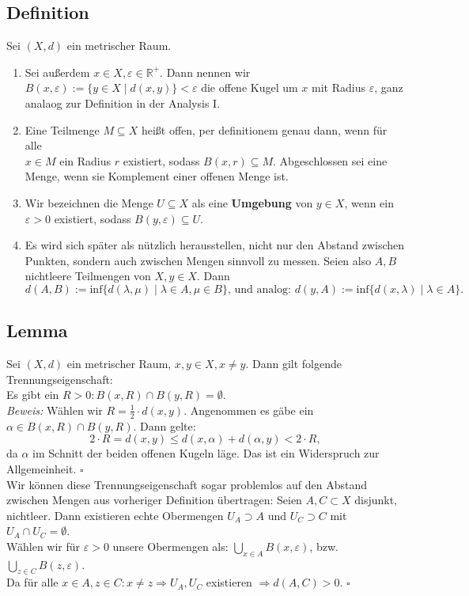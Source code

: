 \documentclass[11pt,leqno]{article}
\begin{document}
\subsection{Definition}
Sei $(X,d)$ ein metrischer Raum.
\begin{enumerate}
    \item Sei außerdem $x \in X, \varepsilon \in \mathbb{R}^+$. Dann nennen wir $B(x,\varepsilon):=\{y \in X \mid d(x,y) \} < \varepsilon$ die offene 
    Kugel um $x$ mit Radius $\varepsilon$, ganz analaog zur Definition in der Analysis I. 
    \item Eine Teilmenge $M \subseteq X$ heißt offen, per definitionem genau dann, wenn für alle \\ $x \in M$ ein Radius $r$ existiert, 
    sodass $B(x,r) \subseteq M$. Abgeschlossen sei eine Menge, wenn sie Komplement einer offenen Menge ist.
    \item Wir bezeichnen die Menge $U \subseteq X$ als eine \textbf{Umgebung} von $y \in X$, wenn ein $\varepsilon > 0$ existiert, 
    sodass $B(y,\varepsilon) \subseteq U$.
    \item Es wird sich später als nützlich herausstellen, nicht nur den Abstand zwischen Punkten, sondern auch zwischen Mengen sinnvoll zu messen. 
    Seien also $A,B$ nichtleere Teilmengen von $X, y \in X$. 
    Dann \[d(A,B):= \text{inf}\{d(\lambda, \mu) \mid \lambda \in A, \mu \in B \}\text{, und analog: }d(y,A):= 
    \text{inf}\{d(x, \lambda) \mid \lambda \in A \}.\]
\end{enumerate}

\subsection{Lemma}
Sei $(X,d)$ ein metrischer Raum, $x,y \in X, x \neq y$. Dann gilt folgende Trennungseigenschaft: \\
Es gibt ein $R > 0: B(x,R) \cap B(y,R) = \emptyset$. \\
\textit{Beweis:} Wählen wir $R= \frac{1}{2} \cdot d(x,y)$. Angenommen es gäbe ein $\alpha \in B(x,R) \cap B(y,R)$. Dann gelte: 
\[2 \cdot R = d(x,y) \leq d(x,\alpha) + d(\alpha,y) < 2 \cdot R, \]
da $\alpha$ im Schnitt der beiden offenen Kugeln läge. Das ist ein Widerspruch zur Allgemeinheit. $\square$\\
Wir können diese Trennungseigenschaft sogar problemlos auf den Abstand zwischen Mengen aus vorheriger Definition übertragen: 
Seien $A,C \subset X$ disjunkt, nichtleer. Dann existieren echte Obermengen $U_A \supset A$ und $U_C \supset C$ mit $U_A \cap U_C = \emptyset$. \\
Wählen wir für $\varepsilon > 0$ unsere Obermengen als: $\bigcup_{x \in A}B(x,\varepsilon) $, bzw. $\bigcup_{z \in C}B(z,\varepsilon) $.\\ 
Da für alle $x\in A, z \in C: x \neq z \Rightarrow U_A, U_C$ existieren $\Rightarrow d(A,C) > 0$. $\square$
\end{document}
